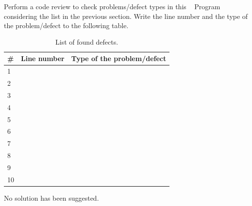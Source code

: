 \begin{exercise}
    Perform a code review to check problems/defect types in this \CC~ Program considering the list in the previous section. Write the line number and the type of the problem/defect to the following table.
    
    \begin{table}[H]
    \centering
    \renewcommand{\arraystretch}{1.2}
    \caption{List of found defects.}
    \label{tab:defects-ex}
    \begin{tabular}{p{}|p{}|p{}}
        \toprule
        \# & Line number & Type of the problem/defect\\
        \midrule
        1 & & \\
        \midrule
        2 & & \\
        \midrule
        3 & & \\
        \midrule
        4 & & \\
        \midrule
        5 & & \\
        \midrule
        6 & & \\
        \midrule
        7 & & \\
        \midrule
        8 & & \\
        \midrule
        9 & & \\
        \midrule
        10 & & \\
        \bottomrule
    \end{tabular}
\end{table}
\end{exercise}

\begin{solution}
    No solution has been suggested.
\end{solution}


